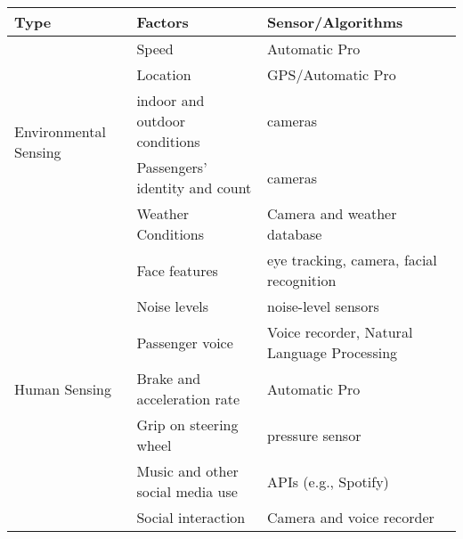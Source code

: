 \begin{center}
    \begin{tabular}{ | l | l | l |}
    \hline
    Type &  Factors & Sensor/Algorithms \\ \hline
    \multirow{5}{*}{Environmental Sensing} & Speed & Automatic Pro \\
        & Location & GPS/Automatic Pro \\
        & indoor and outdoor conditions & cameras \\
        & Passengers' identity and count & cameras \\
        & Weather Conditions & Camera and weather database\\\hline
    \multirow{8}{*}{Human Sensing} & Face features & eye tracking, camera, facial recognition \\
        & Noise levels & noise-level sensors \\
        & Passenger voice & Voice recorder, Natural Language Processing \\
        & Brake and acceleration rate & Automatic Pro \\
        & Grip on steering wheel & pressure sensor \\
        & Music and other social media use & APIs (e.g., Spotify) \\
        & Social interaction & Camera and voice recorder \\ \hline
    
    \end{tabular}
\end{center}












